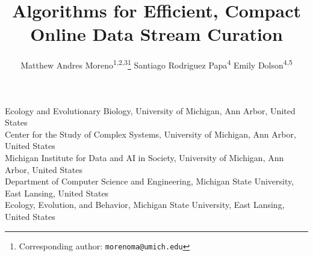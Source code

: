 \title{ Algorithms for Efficient, Compact Online Data Stream Curation }
\author{
    Matthew Andres Moreno\textsuperscript{1,2,3}\thanks{Corresponding author: \texttt{morenoma@umich.edu}} \quad
    Santiago Rodriguez Papa\textsuperscript{4} \quad
    Emily Dolson\textsuperscript{4,5} \quad
}
\date{}

\newcommand{\affiliations}{
\affil{1} Ecology and Evolutionary Biology, University of Michigan, Ann Arbor, United States \\
\affil{2} Center for the Study of Complex Systems, University of Michigan, Ann Arbor, United States \\
\affil{3} Michigan Institute for Data and AI in Society, University of Michigan, Ann Arbor, United States \\
\affil{4} Department of Computer Science and Engineering, Michigan State University, East Lansing, United States \\
\affil{5} Ecology, Evolution, and Behavior, Michigan State University, East Lansing, United States \\
}

\maketitle

\begin{center}
\affiliations
\end{center}


